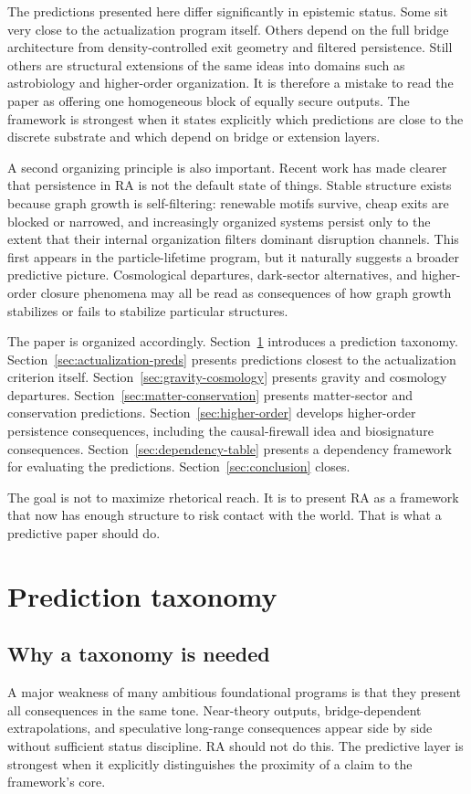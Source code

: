 \documentclass[11pt]{article}
\begin{document}
The predictions presented here differ significantly in epistemic status. Some sit very close to the actualization program itself. Others depend on the full bridge architecture from density-controlled exit geometry and filtered persistence. Still others are structural extensions of the same ideas into domains such as astrobiology and higher-order organization. It is therefore a mistake to read the paper as offering one homogeneous block of equally secure outputs. The framework is strongest when it states explicitly which predictions are close to the discrete substrate and which depend on bridge or extension layers.

A second organizing principle is also important. Recent work has made clearer that persistence in RA is not the default state of things. Stable structure exists because graph growth is self-filtering: renewable motifs survive, cheap exits are blocked or narrowed, and increasingly organized systems persist only to the extent that their internal organization filters dominant disruption channels. This first appears in the particle-lifetime program, but it naturally suggests a broader predictive picture. Cosmological departures, dark-sector alternatives, and higher-order closure phenomena may all be read as consequences of how graph growth stabilizes or fails to stabilize particular structures.

The paper is organized accordingly. Section~\ref{sec:taxonomy} introduces a prediction taxonomy. Section~\ref{sec:actualization-preds} presents predictions closest to the actualization criterion itself. Section~\ref{sec:gravity-cosmology} presents gravity and cosmology departures. Section~\ref{sec:matter-conservation} presents matter-sector and conservation predictions. Section~\ref{sec:higher-order} develops higher-order persistence consequences, including the causal-firewall idea and biosignature consequences. Section~\ref{sec:dependency-table} presents a dependency framework for evaluating the predictions. Section~\ref{sec:conclusion} closes.

The goal is not to maximize rhetorical reach. It is to present RA as a framework that now has enough structure to risk contact with the world. That is what a predictive paper should do.

\section{Prediction taxonomy}\label{sec:taxonomy}
\subsection{Why a taxonomy is needed}
A major weakness of many ambitious foundational programs is that they present all consequences in the same tone. Near-theory outputs, bridge-dependent extrapolations, and speculative long-range consequences appear side by side without sufficient status discipline. RA should not do this. The predictive layer is strongest when it explicitly distinguishes the proximity of a claim to the framework's core.
\end{document}
